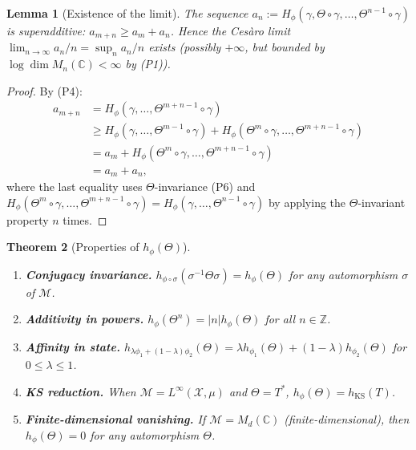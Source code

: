 \documentclass[12pt,a4paper]{article}
\newtheorem{theorem}{Theorem}[section]
\newtheorem{lemma}[theorem]{Lemma}
\newcommand{\CC}{\mathbb{C}}
\newcommand{\ZZ}{\mathbb{Z}}
\newcommand{\Mn}{M_n(\CC)}
\newcommand{\Md}{M_d(\CC)}
\newcommand{\vN}{\mathcal{M}}      %
\newcommand{\thetaaut}{\Theta}
\newcommand{\Hphi}{H_{\phi}}
\newcommand{\hphi}{h_{\phi}}
\begin{document}
\begin{lemma}[Existence of the limit]\label{lem:limit_exists}
The sequence $a_n:=\Hphi(\gamma,\thetaaut\circ\gamma,\ldots,\thetaaut^{n-1}\circ\gamma)$
is superadditive: $a_{m+n}\ge a_m+a_n$.  Hence the Cesàro limit
$\lim_{n\to\infty}a_n/n=\sup_n a_n/n$ exists (possibly $+\infty$, but
bounded by $\log\dim\Mn<\infty$ by (P1)).
\end{lemma}

\begin{proof}
By (P4):
\begin{align*}
  a_{m+n}
  &= \Hphi(\gamma,\ldots,\thetaaut^{m+n-1}\circ\gamma)\\
  &\ge \Hphi(\gamma,\ldots,\thetaaut^{m-1}\circ\gamma)
     + \Hphi(\thetaaut^m\circ\gamma,\ldots,\thetaaut^{m+n-1}\circ\gamma)\\
  &= a_m + \Hphi(\thetaaut^m\circ\gamma,\ldots,\thetaaut^{m+n-1}\circ\gamma)\\
  &= a_m + a_n,
\end{align*}
where the last equality uses $\thetaaut$-invariance (P6) and
$\Hphi(\thetaaut^m\circ\gamma,\ldots,\thetaaut^{m+n-1}\circ\gamma)=
\Hphi(\gamma,\ldots,\thetaaut^{n-1}\circ\gamma)$ by applying the
$\thetaaut$-invariant property $n$ times.
\end{proof}

\begin{theorem}[Properties of $\hphi(\thetaaut)$]\label{thm:cnt_props}
\begin{enumerate}
\item[(i)] \textbf{Conjugacy invariance.}
  $h_{\phi\circ\sigma}(\sigma^{-1}\thetaaut\sigma)=\hphi(\thetaaut)$
  for any automorphism $\sigma$ of $\vN$.
\item[(ii)] \textbf{Additivity in powers.}
  $h_\phi(\thetaaut^n)=|n|\hphi(\thetaaut)$ for all $n\in\ZZ$.
\item[(iii)] \textbf{Affinity in state.}
  $h_{\lambda\phi_1+(1-\lambda)\phi_2}(\thetaaut)
  = \lambda h_{\phi_1}(\thetaaut)+(1-\lambda)h_{\phi_2}(\thetaaut)$
  for $0\le\lambda\le 1$.
\item[(iv)] \textbf{KS reduction.}
  When $\vN=L^\infty(\mathcal{X},\mu)$ and $\thetaaut=T^*$, $\hphi(\thetaaut)=h_{\mathrm{KS}}(T)$.
\item[(v)] \textbf{Finite-dimensional vanishing.}
  If $\vN=\Md$ (finite-dimensional), then $\hphi(\thetaaut)=0$ for any automorphism $\thetaaut$.
\end{enumerate}
\end{theorem}
\end{document}
